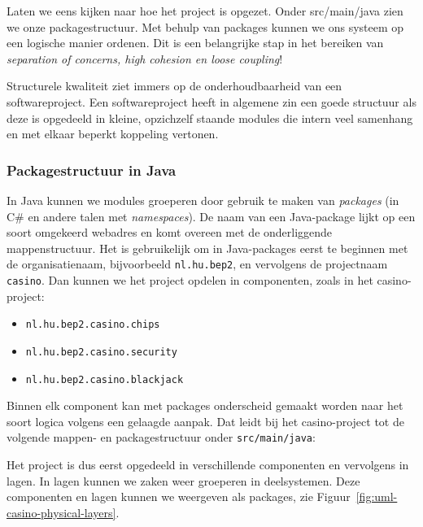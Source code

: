 \documentclass[dutch,a4paper,12pt,doubleside]{book}
\begin{document}
Laten we eens kijken naar hoe het project is opgezet.
Onder src/main/java zien we onze packagestructuur.
Met behulp van packages kunnen we ons systeem op een logische manier 
ordenen. Dit is een belangrijke stap in het bereiken van 
\textit{separation of concerns, high cohesion en loose coupling}!

Structurele kwaliteit ziet immers op de onderhoudbaarheid
van een softwareproject. Een softwareproject heeft in algemene zin 
een goede structuur als deze is opgedeeld in kleine,
opzichzelf staande modules die intern veel samenhang 
en met elkaar beperkt koppeling vertonen.

\newpage
\subsubsection{Packagestructuur in Java}
In Java kunnen we modules groeperen door gebruik te maken van 
\emph{packages} (in C\# en andere talen met \emph{namespaces}).
De naam van een Java-package lijkt op een soort omgekeerd webadres
en komt overeen met de onderliggende mappenstructuur.
Het is gebruikelijk om in Java-packages eerst te beginnen met de organisatienaam,
bijvoorbeeld \texttt{nl.hu.bep2}, en vervolgens de projectnaam \texttt{casino}.
Dan kunnen we het project opdelen in componenten, zoals in het casino-project: 
\begin{itemize}
\item \texttt{nl.hu.bep2.casino.chips}
\item \texttt{nl.hu.bep2.casino.security}
\item \texttt{nl.hu.bep2.casino.blackjack}
\end{itemize}

Binnen elk component kan met packages 
onderscheid gemaakt worden naar het soort logica volgens een gelaagde aanpak. 
Dat leidt bij het casino-project tot de volgende 
mappen- en packagestructuur onder \texttt{src/main/java}:


Het project is dus eerst opgedeeld in verschillende componenten en vervolgens in 
lagen. In lagen kunnen we zaken weer groeperen in deelsystemen. Deze componenten 
en lagen kunnen we weergeven als packages, zie Figuur~\ref{fig:uml-casino-physical-layers}.
\end{document}
